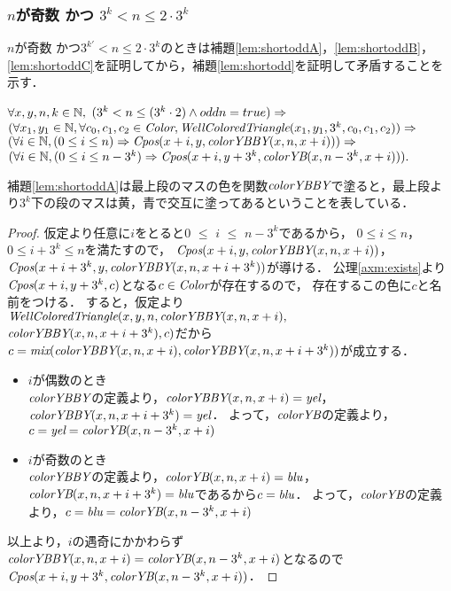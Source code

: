 \subsubsection{$n$が奇数 かつ $3^{k} < n \leq 2 \cdot 3^{k}$}
$n$が奇数 かつ$3^{k'} < n \leq 2 \cdot 3^{k}$のときは補題\ref{lem:shortoddA}，\ref{lem:shortoddB}，\ref{lem:shortoddC}を証明してから，補題\ref{lem:shortodd}を証明して矛盾することを示す．
\begin{lem}[\ShortOddA] \label{lem:shortoddA}
  $\forall x,y,n,k \in \mathbb{N},$
  $(3^k < n \leq (3^k\cdot2) \land odd n = true) \Rightarrow$
  $(\forall x_1,y_1 \in \mathbb{N}, \forall c_0,c_1,c_2 \in \textit{Color}, \textit{WellColoredTriangle}(x_1,y_1,3^k,c_0,c_1,c_2)) \Rightarrow$
  $(\forall i \in \mathbb{N}, (0 \leq i \leq n) \Rightarrow \textit{Cpos}(x+i,y,\textit{colorYBBY}(x,n,x+i))) \Rightarrow$
  $(\forall i \in \mathbb{N}, (0 \leq i \leq n - 3^k) \Rightarrow \textit{Cpos}(x+i,y+3^k,\textit{colorYB}(x,n-3^k,x+i))).$
\end{lem}
補題\ref{lem:shortoddA}は最上段のマスの色を関数$\textit{colorYBBY}$で塗ると，最上段より$3^k$下の段のマスは黄，青で交互に塗ってあるということを表している．
\begin{proof}
  仮定より任意に$i$をとると$0$ $\leq$ $i$ $\leq$ $n-3^k$であるから，
  $0 \leq i \leq n$，$0 \leq i+3^k \leq n$を満たすので，
  $\textit{Cpos}(x+i,y,\textit{colorYBBY}(x,n,x+i))$，$\textit{Cpos}(x+i+3^k,y,\textit{colorYBBY}(x,n,x+i+3^k))$が導ける．
  公理\ref{axm:exists}より$\textit{Cpos}(x+i,y+3^k,c)$となる$c\in\textit{Color}$が存在するので，
  存在するこの色に$c$と名前をつける．
  すると，仮定より$\textit{WellColoredTriangle}(x,y,n,\textit{colorYBBY}(x,n,x+i),$ $\textit{colorYBBY}(x,n,x+i+3^k),c)$だから$c=\textit{mix}(\textit{colorYBBY}(x,n,x+i),\textit{colorYBBY}(x,n,x+i+3^k))$が成立する．
  \begin{itemize}
  \item
    $i$が偶数のとき \\
    $\textit{colorYBBY}$の定義より，$\textit{colorYBBY}(x,n,x+i)=\textit{yel}$，$\textit{colorYBBY}(x,n,x+i+3^k)=\textit{yel}$．
    よって，$\textit{colorYB}$の定義より，$c=\textit{yel}=\textit{colorYB}(x,n-3^k,x+i)$
  \item
    $i$が奇数のとき \\
    $\textit{colorYBBY}$の定義より，$\textit{colorYB}(x,n,x+i)=\textit{blu}$，$\textit{colorYB}(x,n,x+i+3^k)=\textit{blu}$であるから$c=\textit{blu}$．
    よって，$\textit{colorYB}$の定義より，$c=\textit{blu}=\textit{colorYB}(x,n-3^k,x+i)$
  \end{itemize}
  以上より，$i$の遇奇にかかわらず$\textit{colorYBBY}(x,n,x+i)=\textit{colorYB}(x,n-3^k,x+i)$となるので$\textit{Cpos}(x+i,y+3^k,\textit{colorYB}(x,n-3^k,x+i))$．
\end{proof}

